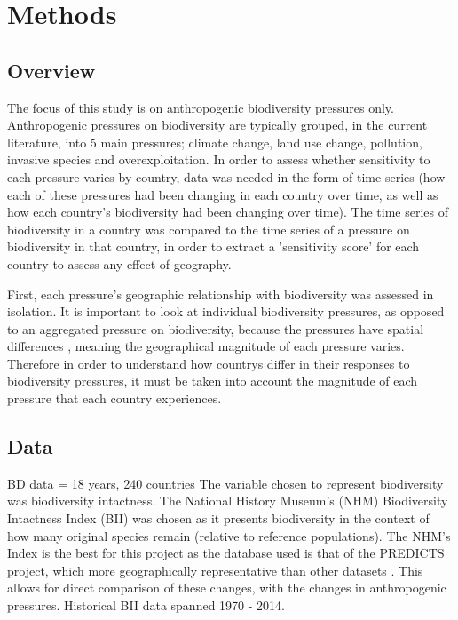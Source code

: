 \documentclass[11pt, a4paper, titlepage]{article}
\begin{document}
   	\newpage

    \section*{Methods}
	\subsection*{Overview}

	The focus of this study is on anthropogenic biodiversity pressures only. Anthropogenic pressures on biodiversity are typically grouped, in the current literature, into 5 main pressures; climate change, land use change, pollution, invasive species and overexploitation. In order to assess whether sensitivity to each pressure varies by country, data was needed in the form of time series (how each of these pressures had been changing in each country over time, as well as how each country's biodiversity had been changing over time). The time series of biodiversity in a country was compared to the time series of a pressure on biodiversity in that country, in order to extract a 'sensitivity score' for each country to assess any effect of geography. \newline
	
	First, each pressure's geographic relationship with biodiversity was assessed in isolation. It is important to look at individual biodiversity pressures, as opposed to an aggregated pressure on biodiversity, because the pressures have spatial differences \citep{steffen2015planetary}, meaning the geographical magnitude of each pressure varies. Therefore in order to understand how countrys differ in their responses to biodiversity pressures, it must be taken into account the magnitude of each pressure that each country experiences. \newline
	\subsection*{Data}
	
	BD data = 18 years, 240 countries
	The variable chosen to represent biodiversity was biodiversity intactness. The National History Museum's (NHM) Biodiversity Intactness Index (BII)\citep{phillips2021} was chosen as it presents biodiversity in the context of how many original species remain (relative to reference populations). The NHM's Index is the best for this project as the database used is that of the PREDICTS project, which more geographically representative than other datasets \citep{purvis2018modelling}. This allows for direct comparison of these changes, with the changes in anthropogenic pressures. Historical BII data spanned 1970 - 2014. \newline
	
\end{document}

